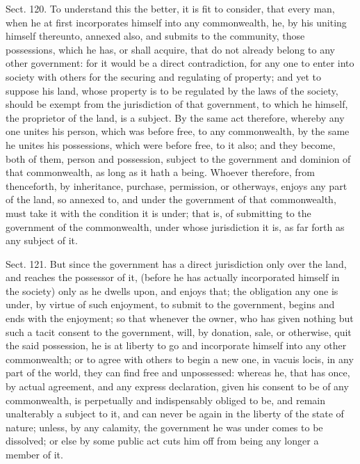 \documentclass[11pt,openany]{book}
\begin{document}
Sect. 120. To understand this the better, it is fit to consider, that every man, when he at first incorporates himself into any commonwealth, he, by his uniting himself thereunto, annexed also, and submits to the community, those possessions, which he has, or shall acquire, that do not already belong to any other government: for it would be a direct contradiction, for any one to enter into society with others for the securing and regulating of property; and yet to suppose his land, whose property is to be regulated by the laws of the society, should be exempt from the jurisdiction of that government, to which he himself, the proprietor of the land, is a subject. By the same act therefore, whereby any one unites his person, which was before free, to any commonwealth, by the same he unites his possessions, which were before free, to it also; and they become, both of them, person and possession, subject to the government and dominion of that commonwealth, as long as it hath a being. Whoever therefore, from thenceforth, by inheritance, purchase, permission, or otherways, enjoys any part of the land, so annexed to, and under the government of that commonwealth, must take it with the condition it is under; that is, of submitting to the government of the commonwealth, under whose jurisdiction it is, as far forth as any subject of it.

Sect. 121. But since the government has a direct jurisdiction only over the land, and reaches the possessor of it, (before he has actually incorporated himself in the society) only as he dwells upon, and enjoys that; the obligation any one is under, by virtue of such enjoyment, to submit to the government, begins and ends with the enjoyment; so that whenever the owner, who has given nothing but such a tacit consent to the government, will, by donation, sale, or otherwise, quit the said possession, he is at liberty to go and incorporate himself into any other commonwealth; or to agree with others to begin a new one, in vacuis locis, in any part of the world, they can find free and unpossessed: whereas he, that has once, by actual agreement, and any express declaration, given his consent to be of any commonwealth, is perpetually and indispensably obliged to be, and remain unalterably a subject to it, and can never be again in the liberty of the state of nature; unless, by any calamity, the government he was under comes to be dissolved; or else by some public act cuts him off from being any longer a member of it.
\end{document}

